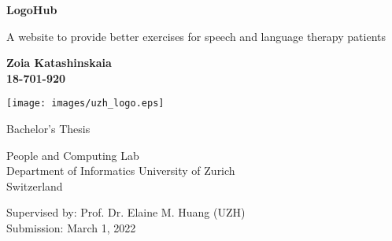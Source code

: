 \begin{titlepage}
    \begin{center}
        \vspace*{1cm}
        
        \Huge
        \textbf{LogoHub}
        
        \vspace{0.5cm}
        \LARGE
        A website to provide better exercises for speech and language therapy patients
        
        \vspace{1.5cm}
        
        \textbf{Zoia Katashinskaia\\18-701-920}
        
        \vfill
        
        \texttt{[image: images/uzh\_logo.eps]}
        
        \vspace{2cm}
        
        Bachelor's Thesis
        
        \vspace{1cm}
        
        \Large
        People and Computing Lab\\
        Department of Informatics
        University of Zurich\\
        Switzerland\\
        
        \vspace{1cm}
        
        Supervised by: Prof. Dr. Elaine M. Huang (UZH)\\
        Submission: March 1, 2022
        
    \end{center}
\end{titlepage}